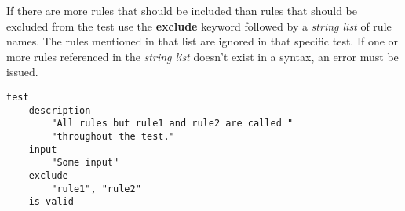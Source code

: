 

If there are more rules that should be included than rules that should be
excluded from the test use the \textbf{exclude} keyword followed by a 
\textit{string list} of rule names. The rules mentioned in that list are ignored
in that specific test. If one or more rules referenced in the 
\textit{string list} doesn't exist in a syntax, an error must be issued.

\begin{lstlisting}[style = SrtL]
test
    description
        "All rules but rule1 and rule2 are called "
        "throughout the test."
    input 
        "Some input"
    exclude
        "rule1", "rule2"
    is valid
\end{lstlisting}